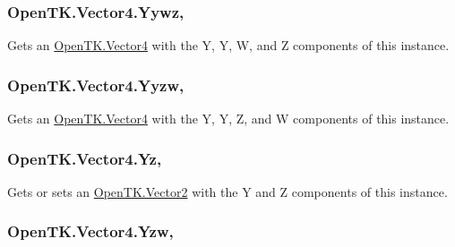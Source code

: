 \hypertarget{struct_open_t_k_1_1_vector4_a964adcf52ba8064c089af46176bbf562}{
\subsubsection[{Yywz}]{ Open\-T\-K.\-Vector4.\-Yywz\hspace{0.3cm}{\ttfamily [get]}, {\ttfamily [set]}}}\label{struct_open_t_k_1_1_vector4_a964adcf52ba8064c089af46176bbf562}


Gets an \hyperlink{struct_open_t_k_1_1_vector4}{Open\-T\-K.\-Vector4} with the Y, Y, W, and Z components of this instance. 

\hypertarget{struct_open_t_k_1_1_vector4_a22ee2457a51a8b0e5239826ad15fc7a5}{
\subsubsection[{Yyzw}]{ Open\-T\-K.\-Vector4.\-Yyzw\hspace{0.3cm}{\ttfamily [get]}, {\ttfamily [set]}}}\label{struct_open_t_k_1_1_vector4_a22ee2457a51a8b0e5239826ad15fc7a5}


Gets an \hyperlink{struct_open_t_k_1_1_vector4}{Open\-T\-K.\-Vector4} with the Y, Y, Z, and W components of this instance. 

\hypertarget{struct_open_t_k_1_1_vector4_a045001f835440f1e80dfc399f443e3ef}{
\subsubsection[{Yz}]{ Open\-T\-K.\-Vector4.\-Yz\hspace{0.3cm}{\ttfamily [get]}, {\ttfamily [set]}}}\label{struct_open_t_k_1_1_vector4_a045001f835440f1e80dfc399f443e3ef}


Gets or sets an \hyperlink{struct_open_t_k_1_1_vector2}{Open\-T\-K.\-Vector2} with the Y and Z components of this instance. 

\hypertarget{struct_open_t_k_1_1_vector4_a71bbd7c966a9f3fb8fc2792170d82ba8}{
\subsubsection[{Yzw}]{ Open\-T\-K.\-Vector4.\-Yzw\hspace{0.3cm}{\ttfamily [get]}, {\ttfamily [set]}}}\label{struct_open_t_k_1_1_vector4_a71bbd7c966a9f3fb8fc2792170d82ba8}


